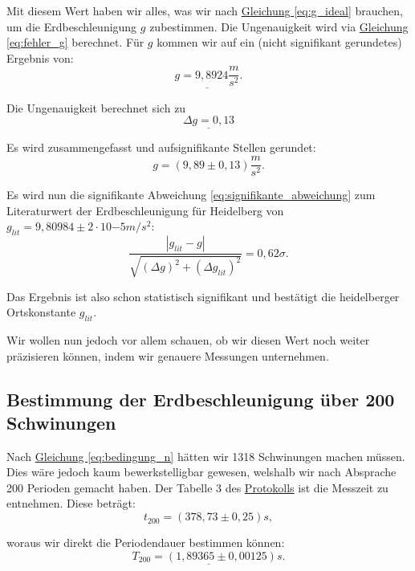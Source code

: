 Mit diesem Wert haben wir alles, was wir nach \hyperref[eq:g_ideal]{Gleichung \ref*{eq:g_ideal}} brauchen, um die Erdbeschleunigung $g$ zubestimmen. Die Ungenauigkeit wird via \hyperref[eq:fehler_g]{Gleichung \ref*{eq:fehler_g}} berechnet.
Für $g$ kommen wir auf ein (nicht signifikant gerundetes) Ergebnis von:
\begin{equation}
    \underline{
        g = 9,8924 \frac{m}{s^2}
    }.
\end{equation}

Die Ungenauigkeit berechnet sich zu
\begin{equation}
    \underline{
        \Delta g = 0,13
    }
\end{equation}


Es wird zusammengefasst und aufsignifikante Stellen gerundet:
\begin{equation}
\boxed{
    g  = ( 9,89 \pm 0,13) \frac{m}{s^2}
}.
\end{equation}

Es wird nun die signifikante Abweichung \ref{eq:signifikante_abweichung} zum Literaturwert der Erdbeschleunigung für Heidelberg von $g_{lit} = 9,80984 \pm 2 \cdot 10{-5} m/s^2$:
\begin{equation}
    \frac{\left| g_{lit} - g \right|}{\sqrt{(\Delta g)^2 + (\Delta g_{lit})^2}} = 0,62\sigma.
\end{equation}

Das Ergebnis ist also schon statistisch signifikant und bestätigt die heidelberger Ortskonstante $g_{lit}$. 

Wir wollen nun jedoch vor allem schauen, ob wir diesen Wert noch weiter präzisieren können, indem wir genauere Messungen unternehmen.


\subsection*{Bestimmung der Erdbeschleunigung über 200 Schwinungen}

Nach \hyperref[eq:bedingung_n]{Gleichung \ref*{eq:bedingung_n}} hätten wir 1318 Schwinungen machen müssen. Dies wäre jedoch kaum bewerkstelligbar gewesen, welshalb wir nach Absprache 200 Perioden gemacht haben. Der Tabelle 3 des \hyperref[Protokoll]{Protokolls} ist die Messzeit zu entnehmen. Diese beträgt:
\begin{equation}
    t_{200} = (378,73 \pm 0,25)s,
\end{equation}

woraus wir direkt die Periodendauer bestimmen können:
\begin{equation}
    \underline{
        T_{200} = (1,89365 \pm 0,00125)s.
    }
\end{equation}

